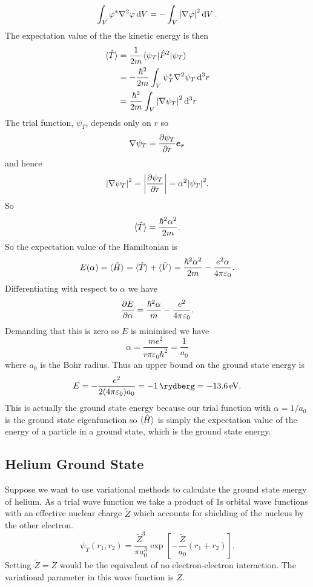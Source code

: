     \[\int_V \varphi^*\nabla^2\varphi \dd{V} = -\int_V \abs{\nabla\varphi}^2\dd{V}.\]
    The expectation value of the the kinetic energy is then
    \begin{align*}
        \langle{\hat{T}}\rangle &= \frac{1}{2m} \langle {\psi_T} \vert \hat{P}^2 \vert {\psi_T} \rangle\\
        &= -\frac{\hbar^2}{2m} \int_V \psi_T^* \nabla^2 \psi_T \dd[3]{r}\\
        &= \frac{\hbar^2}{2m} \int_V \abs{\nabla\psi_T}^2\dd[3]{r}
    \end{align*}
    The trial function, \(\psi_T\), depends only on \(r\) so
    \[\nabla\psi_T = \pdv{\psi_T}{r} \bm{e_{r}}\]
    and hence
    \[\abs{\nabla\psi_T}^2 = \abs{\pdv{\psi_T}{r}} = \alpha^2\abs{\psi_T}^2.\]
    So
    \[\langle{\hat{T}}\rangle = \frac{\hbar^2\alpha^2}{2m}.\]
    So the expectation value of the Hamiltonian is
    \[E(\alpha) = \langle{\hat{H}}\rangle = \langle{\hat{T}}\rangle + \langle{\hat{V}}\rangle = \frac{\hbar^2\alpha^2}{2m} - \frac{e^2\alpha}{4\pi\varepsilon_0}.\]
    Differentiating with respect to \(\alpha\) we have
    \[\pdv{E}{\alpha} = \frac{\hbar^2\alpha}{m} - \frac{e^2}{4\pi\varepsilon_0}.\]
    Demanding that this is zero so \(E\) is minimised we have
    \[\alpha = \frac{me^2}{r\pi\varepsilon_0\hbar^2} = \frac{1}{a_0}\]
    where \(a_0\) is the Bohr radius.
    Thus an upper bound on the ground state energy is
    \[E = -\frac{e^2}{2(4\pi\varepsilon_0)a_0} = \SI{-1}{\rydberg} = \SI{-13.6}{\electronvolt}.\]
    This is actually the ground state energy because our trial function with \(\alpha = 1/a_0\) is the ground state eigenfunction so \(\langle{\hat{H}}\rangle\) is simply the expectation value of the energy of a particle in a ground state, which is the ground state energy.
    
    \subsection{Helium Ground State}
    Suppose we want to use variational methods to calculate the ground state energy of helium.
    As a trial wave function we take a product of 1s orbital wave functions with an effective nuclear charge \(\tilde{Z}\) which accounts for shielding of the nucleus by the other electron.
    \[\psi_T(r_1, r_2) = \frac{\tilde{Z}^3}{\pi a_0^3} \exp\left[-\frac{\tilde{Z}}{a_0}(r_1 + r_2)\right].\]
    Setting \(\tilde{Z} = Z\) would be the equivalent of no electron-electron interaction.
    The variational parameter in this wave function is \(\tilde{Z}\).
    
